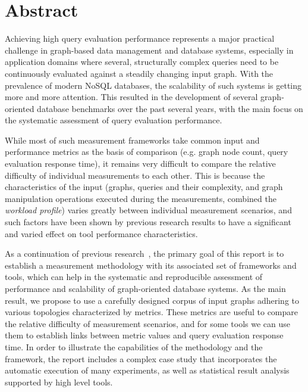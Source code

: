 


\vfill
{}
\englishParagraph


\chapter*{Abstract}

Achieving high query evaluation performance represents a major practical challenge in graph-based data management and database systems, especially in application domains where several, structurally complex queries need to be continuously evaluated against a steadily changing input graph. With the prevalence of modern NoSQL databases, the scalability of such systems is getting more and more attention. This resulted in the development of several graph-oriented database benchmarks over the past several years, with the main focus on the systematic assessment of query evaluation performance.

While most of such measurement frameworks take common input and performance metrics as the basis of comparison (e.g. graph node count, query evaluation response time), it remains very difficult to compare the relative difficulty of individual measurements to each other. This is because the characteristics of the input (graphs, queries and their complexity, and graph manipulation operations executed during the measurements, combined the \emph{workload profile}) varies greatly between individual measurement scenarios, and such factors have been shown by previous research results to have a significant and varied effect on tool performance characteristics.

As a continuation of previous research~\cite{metric_ase}, the primary goal of this report is to establish a measurement methodology with its associated set of frameworks and tools, which can help in the systematic and reproducible assessment of performance and scalability of graph-oriented database systems. As the main result, we propose to use a carefully designed corpus of input graphs adhering to various topologies characterized by metrics. These metrics are useful to compare the relative difficulty of measurement scenarios, and for some tools we can use them to establish links between metric values and query evaluation response time. In order to illustrate the capabilities of the methodology and the framework, the report includes a complex case study that incorporates the automatic execution of many experiments, as well as statistical result analysis supported by high level tools.

